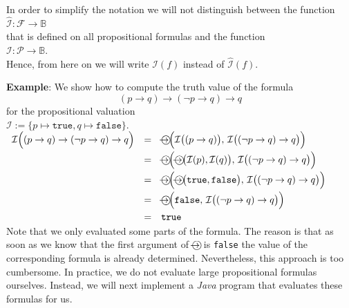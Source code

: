 In order to simplify the notation we will not distinguish between the function
\\[0.2cm]
\hspace*{1.3cm}
$\widehat{\mathcal{I}}: \mathcal{F} \rightarrow \mathbb{B}$
\\[0.2cm]
that is defined on all propositional formulas and the function
\\[0.2cm]
\hspace*{1.3cm}
$\mathcal{I}: \mathcal{P} \rightarrow \mathbb{B}$.
\\[0.2cm]
Hence, from here on we will write $\mathcal{I}(f)$ instead of $\widehat{\mathcal{I}}(f)$.

\noindent
\textbf{Example}: We show how to compute the truth value of the formula
$$  (p \rightarrow q) \rightarrow (\neg p \rightarrow q) \rightarrow q $$
for the propositional valuation
\\[0.2cm]
\hspace*{1.3cm}
$\mathcal{I} := \{ p \mapsto \mathtt{true}, q \mapsto \mathtt{false} \}$.
\\[0.2cm]
\hspace*{1.3cm}
$
  \begin{array}[b]{lcl}
   \mathcal{I}\Bigl( (p \rightarrow q) \rightarrow (\neg p \rightarrow q) \rightarrow q  \Bigr) 
   & = &  \circright\Bigl( \mathcal{I}\bigl( (p \rightarrow q) \bigr),\, \mathcal{I}\bigl((\neg p \rightarrow q) \rightarrow q\bigr) \Bigr) \\[0.2cm]
   & = & \circright\Bigl( \circright\bigl( \mathcal{I}(p), \mathcal{I}(q) \bigr),\, \mathcal{I}\bigl((\neg p \rightarrow q) \rightarrow q\bigr) \Bigr) \\[0.2cm]
   & = & \circright\Bigl( \circright\bigl( \texttt{true}, \texttt{false} \bigr),\, \mathcal{I}\bigl((\neg p \rightarrow q) \rightarrow q\bigr) \Bigr) \\[0.2cm]
   & = & \circright\Bigl( \texttt{false}, \, \mathcal{I}\bigl((\neg p \rightarrow q) \rightarrow q\bigr) \Bigr) \\[0.2cm]
   & = & \texttt{true} 
  \end{array}
$ \eox
\\[0.2cm]
Note that we only evaluated some parts of the formula.  The reason is that as soon as we know that the first
argument of $\circright$ is \texttt{false} the value of the corresponding formula is already determined.
Nevertheless, this approach is too cumbersome.  In practice, we do not evaluate large propositional formulas
ourselves.  Instead, we will next implement a \textsl{Java} program that evaluates these formulas for us.

